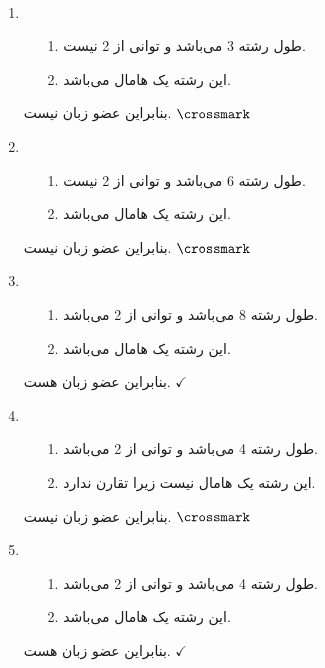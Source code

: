 \\[0.1in]
\begin{enumerate}
    \item 
    \begin{enumerate}
        \item[1.]
         طول رشته 3 می‌باشد و توانی از 2 نیست.
        \item[2.]
        این رشته یک هامال می‌باشد.
    \end{enumerate}
    بنابراین عضو زبان نیست.
    $\crossmark$
    \newline
    \item 
    \begin{enumerate}
        \item[1.]
         طول رشته 6 می‌باشد و توانی از 2 نیست.
        \item[2.]
        این رشته یک هامال می‌باشد.
    \end{enumerate}
    بنابراین عضو زبان نیست.
    $\crossmark$
    \newline
    \item
    \begin{enumerate}
        \item[1.]
         طول رشته 8 می‌باشد و توانی از 2 می‌باشد.
        \item[2.]
        این رشته یک هامال می‌باشد.
    \end{enumerate}
    بنابراین عضو زبان هست.
    $\checkmark$
    \newline
    \item  
    \begin{enumerate}
        \item[1.]
         طول رشته 4 می‌باشد و توانی از 2 می‌باشد.
        \item[2.]
        این رشته یک هامال نیست زیرا تقارن ندارد.
    \end{enumerate}
    بنابراین عضو زبان نیست.
    $\crossmark$
    \newline
    \item 
    \begin{enumerate}
        \item[1.]
         طول رشته 4 می‌باشد و توانی از 2 می‌باشد.
        \item[2.]
        این رشته یک هامال می‌باشد.
    \end{enumerate}
    بنابراین عضو زبان هست.
    $\checkmark$
    \newline
\end{enumerate}